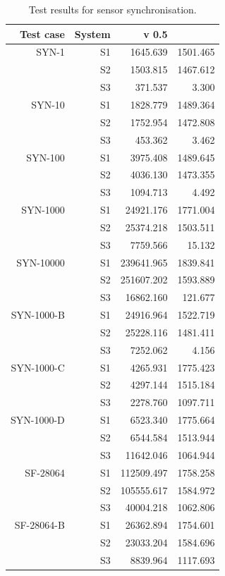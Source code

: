 \begin{table}[h]
  \centering
  \begin{tabular}{r|r|r|r}
	Test case & System & \snowman{} v 0.5 & \bhtb{} \\
\hline
SYN-1 & S1 & 1645.639 & 1501.465 \\
 & S2 & 1503.815 & 1467.612 \\
 & S3 & 371.537 & 3.300 \\
\hline
SYN-10 & S1 & 1828.779 & 1489.364 \\
 & S2 & 1752.954 & 1472.808 \\
 & S3 & 453.362 & 3.462 \\
\hline
SYN-100 & S1 & 3975.408 & 1489.645 \\
 & S2 & 4036.130 & 1473.355 \\
 & S3 & 1094.713 & 4.492 \\
\hline
SYN-1000 & S1 & 24921.176 & 1771.004 \\
 & S2 & 25374.218 & 1503.511 \\
 & S3 & 7759.566 & 15.132 \\
\hline
SYN-10000 & S1 & 239641.965 & 1839.841 \\
 & S2 & 251607.202 & 1593.889 \\
 & S3 & 16862.160 & 121.677 \\
\hline
SYN-1000-B & S1 & 24916.964 & 1522.719 \\
 & S2 & 25228.116 & 1481.411 \\
 & S3 & 7252.062 & 4.156 \\
\hline
SYN-1000-C & S1 & 4265.931 & 1775.423 \\
 & S2 & 4297.144 & 1515.184 \\
 & S3 & 2278.760 & 1097.711 \\
\hline
SYN-1000-D & S1 & 6523.340 & 1775.664 \\
 & S2 & 6544.584 & 1513.944 \\
 & S3 & 11642.046 & 1064.944 \\
\hline
SF-28064 & S1 & 112509.497 & 1758.258 \\
 & S2 & 105555.617 & 1584.972 \\
 & S3 & 40004.218 & 1062.806 \\
\hline
SF-28064-B & S1 & 26362.894 & 1754.601 \\
 & S2 & 23033.204 & 1584.696 \\
 & S3 & 8839.964 & 1117.693 \\
	\hline
  \end{tabular}
  \caption{Test results for sensor synchronisation.}
  \label{tab:testSyncResults}
\end{table}
